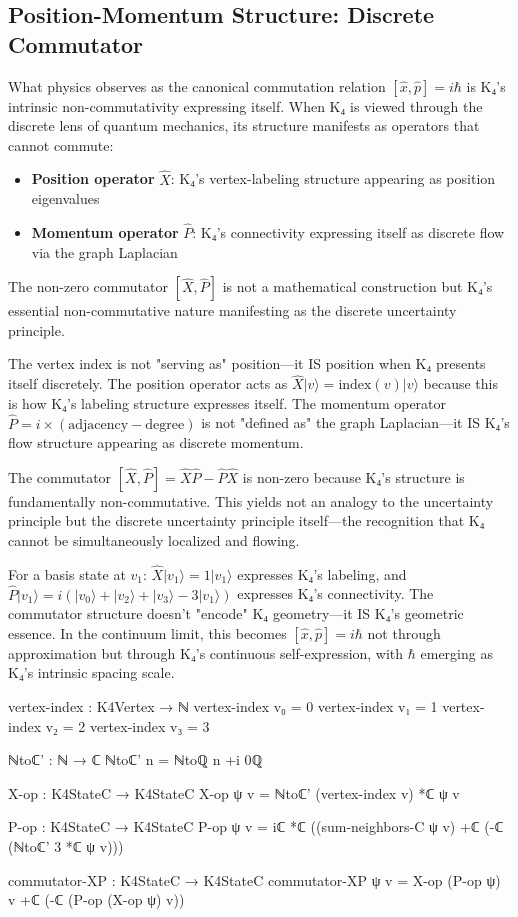 \documentclass[11pt,a4paper]{book}
\begin{document}
\subsection{Position-Momentum Structure: Discrete Commutator}

What physics observes as the canonical commutation relation $[\hat{x},\hat{p}] = i\hbar$ is K₄'s intrinsic non-commutativity expressing itself. When K₄ is viewed through the discrete lens of quantum mechanics, its structure manifests as operators that cannot commute:
\begin{itemize}
  \item \textbf{Position operator} $\hat{X}$: K₄'s vertex-labeling structure appearing as position eigenvalues
  \item \textbf{Momentum operator} $\hat{P}$: K₄'s connectivity expressing itself as discrete flow via the graph Laplacian
\end{itemize}

The non-zero commutator $[\hat{X}, \hat{P}]$ is not a mathematical construction but K₄'s essential non-commutative nature manifesting as the discrete uncertainty principle.

The vertex index is not "serving as" position—it IS position when K₄ presents itself discretely. The position operator acts as $\hat{X}|v\rangle = \text{index}(v)|v\rangle$ because this is how K₄'s labeling structure expresses itself. The momentum operator $\hat{P} = i \times (\text{adjacency} - \text{degree})$ is not "defined as" the graph Laplacian—it IS K₄'s flow structure appearing as discrete momentum.

The commutator $[\hat{X},\hat{P}] = \hat{X}\hat{P} - \hat{P}\hat{X}$ is non-zero because K₄'s structure is fundamentally non-commutative. This yields not an analogy to the uncertainty principle but the discrete uncertainty principle itself—the recognition that K₄ cannot be simultaneously localized and flowing.

For a basis state at $v_1$: $\hat{X}|v_1\rangle = 1|v_1\rangle$ expresses K₄'s labeling, and $\hat{P}|v_1\rangle = i(|v_0\rangle + |v_2\rangle + |v_3\rangle - 3|v_1\rangle)$ expresses K₄'s connectivity. The commutator structure doesn't "encode" K₄ geometry—it IS K₄'s geometric essence. In the continuum limit, this becomes $[\hat{x},\hat{p}] = i\hbar$ not through approximation but through K₄'s continuous self-expression, with $\hbar$ emerging as K₄'s intrinsic spacing scale.

\begin{code}
vertex-index : K4Vertex → ℕ
vertex-index v₀ = 0
vertex-index v₁ = 1
vertex-index v₂ = 2
vertex-index v₃ = 3

ℕtoℂ' : ℕ → ℂ
ℕtoℂ' n = ℕtoℚ n +i 0ℚ

X-op : K4StateC → K4StateC
X-op ψ v = ℕtoℂ' (vertex-index v) *ℂ ψ v

P-op : K4StateC → K4StateC
P-op ψ v = iℂ *ℂ ((sum-neighbors-C ψ v) +ℂ (-ℂ (ℕtoℂ' 3 *ℂ ψ v)))

commutator-XP : K4StateC → K4StateC
commutator-XP ψ v = X-op (P-op ψ) v +ℂ (-ℂ (P-op (X-op ψ) v))
\end{code}
\end{document}
